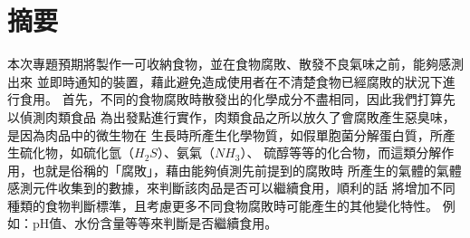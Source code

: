 \chapter*{摘要}

本次專題預期將製作一可收納食物，並在食物腐敗、散發不良氣味之前，能夠感測出來
並即時通知的裝置，藉此避免造成使用者在不清楚食物已經腐敗的狀況下進行食用。
首先，不同的食物腐敗時散發出的化學成分不盡相同，因此我們打算先以偵測肉類食品
為出發點進行實作，肉類食品之所以放久了會腐敗產生惡臭味，是因為肉品中的微生物在
生長時所產生化學物質，如假單胞菌分解蛋白質，所產生硫化物，如硫化氫（$H_2S$）、氨氣（$NH_3$）、
硫醇等等的化合物，而這類分解作用，也就是俗稱的「腐敗」，藉由能夠偵測先前提到的腐敗時
所產生的氣體的氣體感測元件收集到的數據，來判斷該肉品是否可以繼續食用，順利的話
將增加不同種類的食物判斷標準，且考慮更多不同食物腐敗時可能產生的其他變化特性。
例如：pH值、水份含量等等來判斷是否繼續食用。 